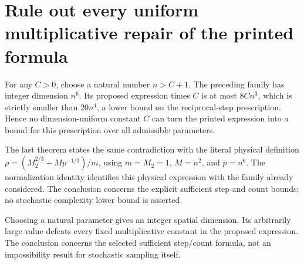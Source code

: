 \documentclass[11pt,a4paper]{article}
\begin{document}
\section{\texorpdfstring{Rule out every uniform multiplicative repair of the printed formula}{Rule out every uniform multiplicative repair of the printed formula}}


For any \(C>0\), choose a natural number \(n>C+1\). The preceding family has integer dimension \(n^6\). Its proposed expression times \(C\) is at most \(8Cn^3\), which is strictly smaller than \(20n^4\), a lower bound on the reciprocal-step prescription. Hence no dimension-uniform constant \(C\) can turn the printed expression into a bound for this prescription over all admissible parameters.



The last theorem states the same contradiction with the literal physical definition \(\rho=(M_2^{2/3}+Mp^{-1/3})/m\), using \(m=M_2=1\), \(M=n^2\), and \(p=n^6\). The normalization identity identifies this physical expression with the family already considered. The conclusion concerns the explicit sufficient step and count bounds; no stochastic complexity lower bound is asserted.



Choosing a natural parameter gives an integer spatial dimension. Its arbitrarily large value defeats every fixed multiplicative constant in the proposed expression. The conclusion concerns the selected sufficient step/\allowbreak{}count formula, not an impossibility result for stochastic sampling itself.
\end{document}
